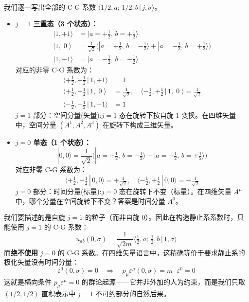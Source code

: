 \medskip
我们逐一写出全部的 C-G 系数 $\langle 1/2,a;\,1/2,b\,|\,j,\sigma\rangle$。
\begin{itemize}
    \item \textbf{$j=1$ 三重态（3 个状态）：}
    \begin{align}
    |1,+1\rangle &= |a{=}+\tfrac{1}{2},\, b{=}+\tfrac{1}{2}\rangle \\
    |1,\;0\;\rangle &= \frac{1}{\sqrt{2}}\Big(|a{=}+\tfrac{1}{2},\, b{=}-\tfrac{1}{2}\rangle + |a{=}-\tfrac{1}{2},\, b{=}+\tfrac{1}{2}\rangle\Big) \\
    |1,-1\rangle &= |a{=}-\tfrac{1}{2},\, b{=}-\tfrac{1}{2}\rangle
    \end{align} 
对应的非零 C-G 系数为：
    \begin{equation}
    \begin{aligned}
        \langle +\tfrac{1}{2},+\tfrac{1}{2}\,|\,1,+1\rangle &= 1 \\
        \langle +\tfrac{1}{2},-\tfrac{1}{2}\,|\,1,\;0\;\rangle &= \tfrac{1}{\sqrt{2}},\quad \langle -\tfrac{1}{2},+\tfrac{1}{2}\,|\,1,\;0\;\rangle = \tfrac{1}{\sqrt{2}} \\
        \langle -\tfrac{1}{2},-\tfrac{1}{2}\,|\,1,-1\rangle &= 1
    \end{aligned}
    \end{equation}
    $j=1$ 部分：空间分量(矢量):$j=1$ 态在旋转下按自旋 $1$ 变换。在四维矢量中，空间分量 $(A^1,A^2,A^3)$ 在旋转下构成三维矢量。
    \item \textbf{$j=0$ 单态（1 个状态）：}
    \begin{equation}
        |0,0\rangle = \frac{1}{\sqrt{2}}\Big(|a{=}+\tfrac{1}{2},\, b{=}-\tfrac{1}{2}\rangle - |a{=}-\tfrac{1}{2},\, b{=}+\tfrac{1}{2}\rangle\Big)
    \end{equation}
    对应非零 C-G 系数为：
    \begin{equation}
        \langle +\tfrac{1}{2},-\tfrac{1}{2}\,|\,0,0\rangle = +\tfrac{1}{\sqrt{2}},\quad \langle -\tfrac{1}{2},+\tfrac{1}{2}\,|\,0,0\rangle = -\tfrac{1}{\sqrt{2}}
    \end{equation}
    $j=0$ 部分：时间分量(标量):$j=0$ 态在旋转下不变（标量）。在四维矢量 $A^\mu$ 中，哪个分量在空间旋转下不变？答案是时间分量 $A^0$。
\end{itemize}
我们要描述的是自旋 $j=1$ 的粒子（而非自旋 $0$）。因此在构造静止系系数时，只能使用 $j=1$ 的 C-G 系数：
\begin{equation}
    u_{ab}(0,\sigma) = \frac{1}{\sqrt{2m}}\langle\tfrac{1}{2},a;\,\tfrac{1}{2},b\,|\,1,\sigma\rangle
\end{equation}
而\textbf{绝不使用} $j=0$ 的 C-G 系数。在四维矢量语言中，这精确等价于要求静止系的极化矢量没有时间分量：
\begin{equation}
    \varepsilon^0(0,\sigma)=0 \quad\Longrightarrow\quad p_\mu\varepsilon^\mu(0,\sigma)=m\cdot\varepsilon^0=0
\end{equation}
这就是横向条件 $p_\mu\varepsilon^\mu=0$ 的群论起源——它并非外加的人为约束，而是我们只取 $(1/2,1/2)$ 直积表示中 $j=1$ 不可约部分的自然后果。

